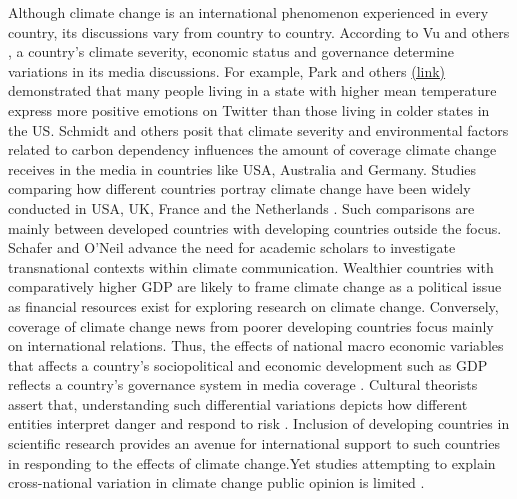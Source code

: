 \documentclass{article}
\begin{document}
Although climate change is an international phenomenon experienced in every country, its discussions vary from country to country. According to Vu and others \cite{vu_nationalizing_2019}, a country’s climate severity, economic status and governance determine variations in its media discussions. For example, Park and others \cite{park_mood_2013} \href{https://pdfs.semanticscholar.org/b282/feb759e57530b115dcc4bb080f96598a5246.pdf}{(link)} demonstrated that many people living in a state with higher mean temperature express more positive emotions on Twitter than those living in colder states in the US. Schmidt and others \cite{schmidt_media_2013} posit that climate severity and environmental factors related to carbon dependency influences the amount of coverage climate change receives in the media in countries like USA, Australia and Germany. Studies comparing how different countries portray climate change have been widely conducted in USA, UK, France and the Netherlands \cite{vu_nationalizing_2019}. Such comparisons are mainly between developed countries with developing countries outside the focus.  Schafer and O’Neil \cite{schafer_what_2013} advance the need for academic scholars to investigate transnational contexts within climate communication. Wealthier countries with comparatively higher GDP are likely to frame climate change as a political issue as financial resources exist for exploring research on climate change. Conversely, coverage of climate change news from poorer developing countries focus mainly on international relations. Thus, the effects of national macro economic variables that affects a country’s sociopolitical and economic development such as GDP reflects a country’s governance system in media coverage \cite{vu_what_2018}. Cultural theorists assert that, understanding such differential variations depicts how different entities interpret danger and respond to risk \cite{tansey_cultural_1999}. Inclusion of developing countries in scientific research provides an avenue for international support to such countries in responding to the effects of climate change.Yet studies attempting to explain cross-national variation in climate change public opinion is limited \cite{knight_public_2016}.
\end{document}
